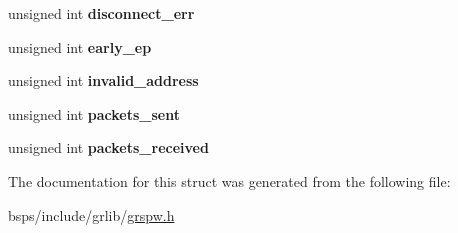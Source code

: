 \begin{DoxyCompactItemize}
\mbox{\label{structspw__stats_a15cf3826907212b57763489a7243dc11}} 
unsigned int {\bfseries disconnect\+\_\+err}
\item 
\mbox{\label{structspw__stats_a02c8753d61f0aec49b91e42b89ea1fbf}} 
unsigned int {\bfseries early\+\_\+ep}
\item 
\mbox{\label{structspw__stats_a127aeedf0a4a3c010280f5532c5f9b6e}} 
unsigned int {\bfseries invalid\+\_\+address}
\item 
\mbox{\label{structspw__stats_a819226121aea17fea5e4f8f20b60d213}} 
unsigned int {\bfseries packets\+\_\+sent}
\item 
\mbox{\label{structspw__stats_adb7af9eedcaa6c080c2c11afcec4d6c2}} 
unsigned int {\bfseries packets\+\_\+received}
\end{DoxyCompactItemize}


The documentation for this struct was generated from the following file\+:\begin{DoxyCompactItemize}
\item 
bsps/include/grlib/\mbox{\hyperlink{grspw_8h}{grspw.\+h}}\end{DoxyCompactItemize}

